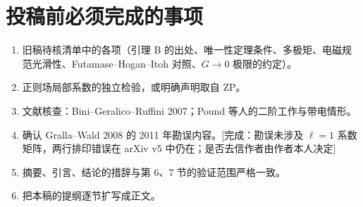 \documentclass[11pt,a4paper]{ctexart}
\newcommand{\status}[1]{\hfill{\small\color{blue!50!black}[#1]}}
\begin{document}
\section*{投稿前必须完成的事项}
\begin{enumerate}[nosep]
\item 旧稿待核清单中的各项（引理 B 的出处、唯一性定理条件、多极矩、电磁规范光滑性、Futamase--Hogan--Itoh 对照、$G\to0$ 极限的约定）。
\item 正则场局部系数的独立检验，或明确声明取自 ZP。
\item 文献核查：Bini--Geralico--Ruffini 2007；Pound 等人的二阶工作与带电情形。
\item 确认 Gralla--Wald 2008 的 2011 年勘误内容。\status{完成：勘误未涉及 $\ell=1$ 系数矩阵，两行排印错误在 arXiv v5 中仍在；是否去信作者由作者本人决定}
\item 摘要、引言、结论的措辞与第 6、7 节的验证范围严格一致。
\item 把本稿的提纲逐节扩写成正文。
\end{enumerate}



\end{document}
